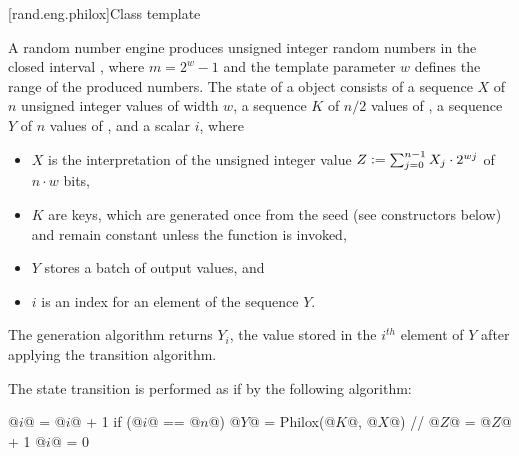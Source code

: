 [rand.eng.philox]{Class template }%
%

\pnum
A  random number engine produces
unsigned integer random numbers in the closed interval ,
where $m = 2^w - 1$ and
the template parameter $w$ defines the range of the produced numbers.
The state of a  object consists of
a sequence $X$ of $n$ unsigned integer values of width $w$,
a sequence $K$ of $n/2$ values of ,
a sequence $Y$ of $n$ values of , and
a scalar $i$, where
\begin{itemize}
\item
$X$ is the interpretation of the unsigned integer  value
$Z \mathrel{\mathop:}= \sum_{j = 0}^{n - 1} X_j \cdot 2^{wj}$ of $n \cdot w$ bits,
\item
$K$ are keys, which are generated once from the seed (see constructors below)
and remain constant unless the  function is invoked,
\item
$Y$ stores a batch of output values, and
\item
$i$ is an index for an element of the sequence $Y$.
\end{itemize}

\pnum
The generation algorithm returns $Y_i$,
the value stored in the $i^{th}$ element of $Y$ after applying
the transition algorithm.

\pnum
The state transition is performed as if by the following algorithm:
\begin{codeblock}
@$i$@ = @$i$@ + 1
if (@$i$@ == @$n$@) {
  @$Y$@ = Philox(@$K$@, @$X$@) // \seebelow
  @$Z$@ = @$Z$@ + 1
  @$i$@ = 0
}
\end{codeblock}


